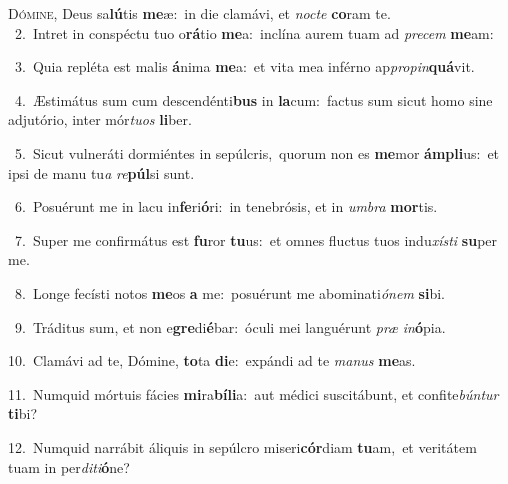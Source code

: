 \lettrine{\initial\textcolor{\initialcolor}{D}}{ómine,} Deus sa\-\textbf{lú}\-tis \textbf{me}\-æ:~\star in die clamávi, et \textit{noc}\-\textit{te} \textbf{co}\-ram te.\\
{\numbfont\textcolor{\numbcolor}{~2.}}~Intret in conspéctu tuo o\-\textbf{rá}\-tio \textbf{me}\-a:~\star inclína aurem tuam ad \textit{pre}\-\textit{cem} \textbf{me}\-am:\par
{\numbfont\textcolor{\numbcolor}{~3.}}~Quia repléta est malis \textbf{á}\-nima \textbf{me}\-a:~\star et vita mea inférno ap\-\textit{pro}\-\textit{pin}\textbf{quá}vit.\par
{\numbfont\textcolor{\numbcolor}{~4.}}~Æstimátus sum cum descendénti\textbf{bus} in \textbf{la}\-cum:~\star factus sum sicut homo sine adjutório, inter mór\-\textit{tu}\-\textit{os} \textbf{li}\-ber.\par
{\numbfont\textcolor{\numbcolor}{~5.}}~Sicut vulneráti dormiéntes in sepúlcris,~\dagger quorum non es \textbf{me}\-mor \textbf{ám}\-\textbf{pli}us:~\star et ipsi de manu tu\textit{a} \textit{re}\-\textbf{púl}si sunt.\par
{\numbfont\textcolor{\numbcolor}{~6.}}~Posuérunt me in lacu in\-\textbf{fe}\-ri\-\textbf{ó}\-ri:~\star in tenebrósis, et in \textit{um}\-\textit{bra} \textbf{mor}\-tis.\par
{\numbfont\textcolor{\numbcolor}{~7.}}~Super me confirmátus est \textbf{fu}\-ror \textbf{tu}\-us:~\star et omnes fluctus tuos indu\-\textit{xís}\-\textit{ti} \textbf{su}\-per me.\par
{\numbfont\textcolor{\numbcolor}{~8.}}~Longe fecísti notos \textbf{me}\-os \textbf{a} me:~\star posuérunt me abominati\-\textit{ó}\-\textit{nem} \textbf{si}\-bi.\par
{\numbfont\textcolor{\numbcolor}{~9.}}~Tráditus sum, et non e\-\textbf{gre}\-di\-\textbf{é}\-bar:~\star óculi mei languérunt \textit{præ} \textit{in}\-\textbf{ó}pia.\par
{\numbfont\textcolor{\numbcolor}{10.}}~Clamávi ad te, Dómine, \textbf{to}\-ta \textbf{di}\-e:~\star expándi ad te \textit{ma}\-\textit{nus} \textbf{me}\-as.\par
{\numbfont\textcolor{\numbcolor}{11.}}~Numquid mórtuis fácies \textbf{mi}\-ra\-\textbf{bí}\-\textbf{li}a:~\star aut médici suscitábunt, et confite\-\textit{bún}\-\textit{tur} \textbf{ti}\-bi?\par
{\numbfont\textcolor{\numbcolor}{12.}}~Numquid narrábit áliquis in sepúlcro miseri\-\textbf{cór}\-diam \textbf{tu}\-am,~\star et veritátem tuam in per\-\textit{di}\-\textit{ti}\textbf{ó}ne?\par
